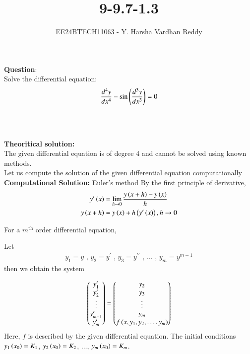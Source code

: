 \documentclass[journal]{IEEEtran}
\begin{document}

\vspace{3cm}

\title{9-9.7-1.3}
\author{EE24BTECH11063 - Y. Harsha Vardhan Reddy}
 \maketitle
{\let\newpage\relax\maketitle}

\renewcommand{\thefigure}{\theenumi}
\renewcommand{\thetable}{\theenumi}
\setlength{\intextsep}{10pt} %


\renewcommand{\thetable}{\theenumi}

\textbf{Question}:\\
Solve the differential equation:\\
$$\frac{d^4y}{dx^4}-\sin{\ensuremath{\left(\frac{d^3y}{dx^3}\right)}}=0$$\\
\solution \\
\\
\textbf{Theoritical solution:}\\
The given differential equation is of degree 4 and cannot be solved using known methods.\\
Let us compute the solution of the given differential equation computationally\\
\textbf{Computational Solution:} Euler's method
\newline
By the first principle of derivative,
\begin{align}
    y^{\prime}\left(x\right) &= \lim_{h\to0} \frac{y\left(x + h\right) - y\left(x\right)}{h}\\
    y\left(x + h\right) &= y\left(x\right) + h\left(y^{\prime}\left(x\right)\right), h\to0
\end{align}

For a $m^{\text{th}}$ order differential equation,
\newline

Let 
\begin{align}
    y_1 = y \text{ , } y_2 = y^{\prime} \text{ , } y_3 = y^{\prime\prime} \text{ , } \dots \text{ , } y_m = y^{m - 1}
\end{align}
then we obtain the system

\begin{align}
    \begin{pmatrix}y_1^{\prime}\\y_2^{\prime}\\\vdots\\y_{m - 1}^{\prime}\\y_m^{\prime}\end{pmatrix} = \begin{pmatrix}y_2\\y_3\\\vdots\\y_m\\f\left(x, y_1, y_2,\dots,y_m\right)\end{pmatrix}
\end{align}
Here, $f$ is described by the given differential equation. The initial conditions $y_1\left(x_0\right) = K_1$, $y_2\left(x_0\right) = K_2$, $\dots$, $y_m\left(x_0\right) = K_m$.
\end{document}
